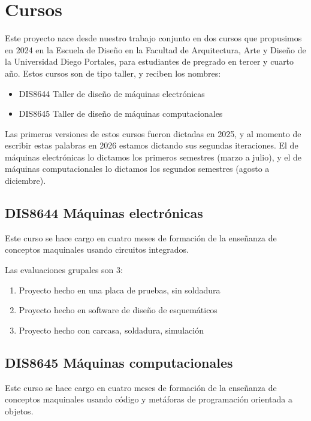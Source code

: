 \documentclass[../principal.tex]{subfiles}
\begin{document}
\chapter{Cursos}

Este proyecto nace desde nuestro trabajo conjunto en dos cursos que propusimos en 2024 en la Escuela de Diseño en la Facultad de Arquitectura, Arte y Diseño de la Universidad Diego Portales, para estudiantes de pregrado en tercer y cuarto año. Estos cursos son de tipo taller, y reciben los nombres:

\begin{itemize}
    \item DIS8644 Taller de diseño de máquinas electrónicas
    \item DIS8645 Taller de diseño de máquinas computacionales
\end{itemize}

Las primeras versiones de estos cursos fueron dictadas en 2025, y al momento de escribir estas palabras en 2026 estamos dictando sus segundas iteraciones. El de máquinas electrónicas lo dictamos los primeros semestres (marzo a julio), y el de máquinas computacionales lo dictamos los segundos semestres (agosto a diciembre).

\section{DIS8644 Máquinas electrónicas}

Este curso se hace cargo en cuatro meses de formación de la enseñanza de conceptos maquinales usando circuitos integrados.

Las evaluaciones grupales son 3:

\begin{enumerate}
    \item Proyecto hecho en una placa de pruebas, sin soldadura
    \item Proyecto hecho en software de diseño de esquemáticos
    \item Proyecto hecho con carcasa, soldadura, simulación
\end{enumerate}


\section{DIS8645 Máquinas computacionales}

Este curso se hace cargo en cuatro meses de formación de la enseñanza de conceptos maquinales usando código y metáforas de programación orientada a objetos.
\end{document}
